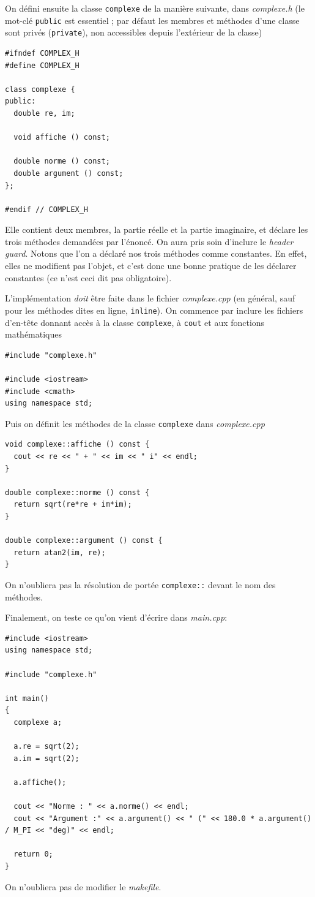 \documentclass{book}
\newcommand{\inline}[1]{\texttt{#1}}
\def\filename{\emph}
\begin{document}
\begin{correction}

On défini ensuite la classe \inline{complexe} de la manière suivante, dans \filename{complexe.h} (le mot-clé \inline{public} est essentiel ; par défaut les membres et méthodes d'une classe sont privés (\inline{private}), non accessibles depuis l'extérieur de la classe)
\begin{verbatim}
#ifndef COMPLEX_H
#define COMPLEX_H

class complexe {
public:
  double re, im;

  void affiche () const;

  double norme () const;
  double argument () const;
};

#endif // COMPLEX_H
\end{verbatim}
Elle contient deux membres, la partie réelle et la partie imaginaire, et déclare les trois méthodes demandées par l'énoncé. On aura pris soin d'inclure le \emph{header guard}. Notons que l'on a déclaré nos trois méthodes comme constantes. En effet, elles ne modifient pas l'objet, et c'est donc une bonne pratique de les déclarer constantes (ce n'est ceci dit pas obligatoire).

L'implémentation \emph{doit} être faite dans le fichier \filename{complexe.cpp} (en général, sauf pour les méthodes dites en ligne, \inline{inline}). On commence par inclure les fichiers d'en-tête donnant accès à la classe \inline{complexe}, à \inline{cout} et aux fonctions mathématiques
\begin{verbatim}
#include "complexe.h"

#include <iostream>
#include <cmath>
using namespace std;
\end{verbatim}
Puis on définit les méthodes de la classe \inline{complexe} dans \filename{complexe.cpp}
\begin{verbatim}
void complexe::affiche () const {
  cout << re << " + " << im << " i" << endl;
}

double complexe::norme () const {
  return sqrt(re*re + im*im);
}

double complexe::argument () const {
  return atan2(im, re);
}
\end{verbatim}
On n'oubliera pas la résolution de portée \inline{complexe::} devant le nom des méthodes.

Finalement, on teste ce qu'on vient d'écrire dans \filename{main.cpp}:
\begin{verbatim}
#include <iostream>
using namespace std;

#include "complexe.h"

int main()
{
  complexe a;

  a.re = sqrt(2);
  a.im = sqrt(2);

  a.affiche();

  cout << "Norme : " << a.norme() << endl;
  cout << "Argument :" << a.argument() << " (" << 180.0 * a.argument() / M_PI << "deg)" << endl;

  return 0;
}
\end{verbatim}

On n'oubliera pas de modifier le \filename{makefile}.

\end{correction}
\end{document}
